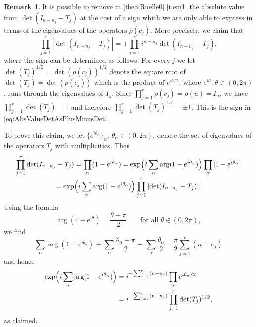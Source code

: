 \documentclass[JEP,XML,SOM,Unicode,NoFloatCountersInSection,published]{cedram}
\theoremstyle{plain}
\theoremstyle{definition}
\newtheorem{rmrk}[thm]{Remark}
\theoremstyle{remark}
\numberwithin{equation}{section}
\begin{document}
\begin{rmrk}\label{rmk:SignInM=0Formula}
It is possible to remove in \cref{theo:Ruelle0} \cref{item1} the absolute value from $\det(I_{n-n_j}-T_j)$ at the cost of a sign which we are only able to express in terms of the eigenvalues of the operators $\rho(c_j)$. More precisely, we claim that
\begin{equation}
\prod_{j=1}^r|{\det}(I_{n-n_j}-T_j)| = \pm\prod_{j=1}^r i^{n-n_j}\det(I_{n-n_j}-T_j),\label{eq:AbsValueDetAsPlusMinusDet}
\end{equation}
where the sign can be determined as follows: For every $j$ we let $\det(T_j)^{1/2}=\det(\rho(c_j))^{1/2}$ denote the square root of $\det(T_j)=\det(\rho(c_j))$ which is the product of $e^{i\theta/2}$, where $e^{i\theta}$, $\theta\in(0,2\pi)$, runs through the eigenvalues of $T_j$. Since $\prod_{j=1}^r\rho(c_j)=\rho(u)=I_n$, we have $\prod_{j=1}^r\det(T_j)=1$ and therefore $\prod_{j=1}^r\det(T_j)^{1/2}=\pm1$. This is the sign in \cref{eq:AbsValueDetAsPlusMinusDet}.

To prove this claim, we let $\{e^{i\theta_\alpha}\}_\alpha$, $\theta_\alpha\in(0,2\pi)$, denote the set of eigenvalues of the operators $T_j$ with multiplicities. Then\vspace*{-3pt}
\begin{multline*}
\prod_{j=1}^r\det(I_{n-n_j}-T_j) = \prod_\alpha(1-e^{i\theta_\alpha}) = \exp\Bigl(i\sum_\alpha\arg(1-e^{i\theta_\alpha})\Bigr)\prod_\alpha|1-e^{i\theta_\alpha}|\\[-3pt]
= \exp\Bigl(i\sum_\alpha\arg(1-e^{i\theta_\alpha})\Bigr)\prod_{j=1}^r|{\det}(I_{n-n_j}-T_j)|.
\end{multline*}
Using the formula\vspace*{-3pt}
\begin{equation}
\arg(1-e^{i\theta}) = \frac{\theta-\pi}{2} \qquad \mbox{for all }\theta\in(0,2\pi),\label{eq:FormulaForArgument1MinusZ}
\end{equation}
we find\vspace*{-3pt}
\[
\sum_\alpha\arg(1-e^{i\theta_\alpha}) = \sum_\alpha\frac{\theta_\alpha-\pi}{2} = \sum_\alpha\frac{\theta_\alpha}{2}-\frac{\pi}{2}\sum_{j=1}^r(n-n_j)
\]
and hence
\begin{align*}
\exp\Bigl(i\sum_\alpha\arg(1-e^{i\theta_\alpha})\Bigr) &= i^{-\sum_{j=1}^r(n-n_j)}\prod_\alpha e^{i\theta_\alpha/2}\\
&= i^{-\sum_{j=1}^r(n-n_j)}\prod_{j=1}^r \det(T_j)^{1/2},
\end{align*}
as claimed.
\end{rmrk}
\end{document}

